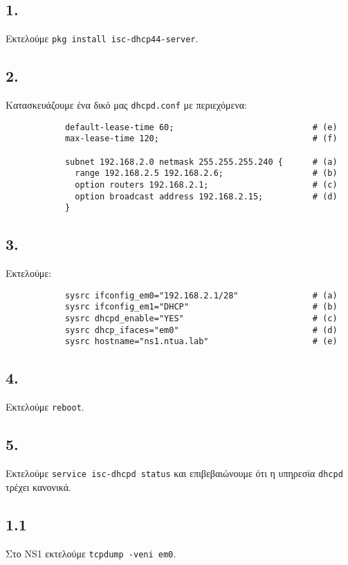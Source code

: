 \documentclass[a4paper, 12pt]{article}
\begin{document}
	\subsection*{1.}
		Εκτελούμε \verb|pkg install isc-dhcp44-server|.
		
	\subsection*{2.}
		Κατασκευάζουμε ένα δικό μας \verb|dhcpd.conf| με περιεχόμενα:
		
		\begin{verbatim}
			default-lease-time 60;                            # (e)
			max-lease-time 120;                               # (f)
			
			subnet 192.168.2.0 netmask 255.255.255.240 {      # (a)
			  range 192.168.2.5 192.168.2.6;                  # (b)
			  option routers 192.168.2.1;                     # (c)
			  option broadcast address 192.168.2.15;          # (d)
			}
		\end{verbatim}
		
	\subsection*{3.}
		Εκτελούμε:
		
		\begin{verbatim}
			sysrc ifconfig_em0="192.168.2.1/28"               # (a)
			sysrc ifconfig_em1="DHCP"                         # (b)
			sysrc dhcpd_enable="YES"                          # (c)
			sysrc dhcp_ifaces="em0"                           # (d)
			sysrc hostname="ns1.ntua.lab"                     # (e)
		\end{verbatim}
	
	\subsection*{4.}
		Εκτελούμε \verb|reboot|.
	
	\subsection*{5.}
		Εκτελούμε \verb|service isc-dhcpd status| και επιβεβαιώνουμε ότι η υπηρεσία \verb|dhcpd| τρέχει κανονικά.
			
	\subsection*{1.1}
		Στο NS1 εκτελούμε \verb|tcpdump -veni em0|.
	
\end{document}
